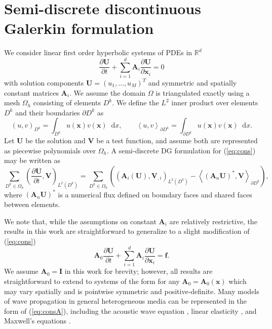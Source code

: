 \documentclass[preprint,10pt]{elsarticle}
\newcommand{\pd}[2]{\frac{\partial#1}{\partial#2}}
\newcommand{\LRp}[1]{\left( #1 \right)}
\newcommand{\LRa}[1]{\left\langle #1 \right\rangle}
\newcommand{\Lk}{L^2\LRp{D^k}}
\newcommand{\Oh}{\Omega_h}
\newcommand*\diff[1]{\mathop{}\!{\mathrm{d}#1}}
\begin{document}
\section{Semi-discrete discontinuous Galerkin formulation}

We consider linear first order hyperbolic systems of PDEs in $\mathbb{R}^d$
\begin{equation}
\pd{\bm{U}}{t} + \sum_{i=1}^d \bm{A}_i\pd{{\bm{U}}}{\bm{x}_i} = 0
\label{eq:cons}
\end{equation}
with solution components $\bm{U} = (u_1, \ldots, u_M)^T$ and symmetric and spatially constant matrices $\bm{A}_i$.  We assume the domain $\Omega$ is triangulated exactly using a mesh $\Oh$ consisting of elements $D^k$.  We define the $L^2$ inner product over elements $D^k$ and their boundaries $\partial D^k$ as
\[
\LRp{u,v}_{D^k} = \int_{D^k} u(\bm{x})v(\bm{x}) \diff x, \qquad \LRa{u,v}_{\partial D^k} = \int_{\partial D^k} u(\bm{x})v(\bm{x}) \diff x.
\]
Let $\bm{U}$ be the solution and $\bm{V}$ be a test function, and assume both are represented as piecewise polynomials over $\Oh$.  A semi-discrete DG formulation for (\ref{eq:cons}) may be written as 
\begin{equation}
\sum_{D^k \in \Oh} \LRp{\pd{\bm{U}}{t},\bm{V} }_{\Lk} = \sum_{D^k \in \Oh}\LRp{ \LRp{\bm{A}_i(\bm{U}), \bm{V}_{,i}}_{\Lk} - \LRa{(\bm{A}_n\bm{U})^*,\bm{V}}_{\partial D^k}}, 
\label{eq:formulation}
\end{equation}
where $(\bm{A}_n\bm{U})^*$ is a numerical flux defined on boundary faces and shared faces between elements.  

We note that, while the assumptions on constant $\bm{A}_i$ are relatively restrictive, the results in this work are straightforward to generalize to a slight modification of (\ref{eq:cons})
\begin{equation}
\bm{A}_0\pd{\bm{U}}{t} + \sum_{i=1}^d \bm{A}_i\pd{{\bm{U}}}{\bm{x}_i} = \bm{f}.
\label{eq:consA}
\end{equation}
We assume $\bm{A}_0 = \bm{I}$ in this work for brevity; however, all results are straightforward to extend to systems of the form for any $\bm{A}_0 = \bm{A}_0(\bm{x})$ which may vary spatially and is pointwise symmetric and positive-definite.  Many models of wave propagation in general heterogeneous media can be represented in the form of (\ref{eq:consA}), including the acoustic wave equation \cite{chan2016weight1}, linear elasticity \cite{de2008interior,wilcox2010high,ye2016discontinuous}, and Maxwell's equations \cite{hesthaven2002nodal,grote2007interior,warburton2013low}.  %
\end{document}
